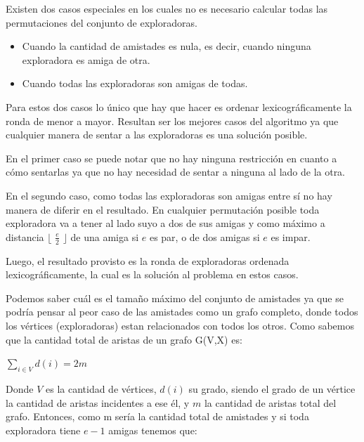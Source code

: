 \documentclass[11pt]{article}
\begin{document}
Existen dos casos especiales en los cuales no es necesario calcular todas las permutaciones del conjunto de exploradoras.
\begin{itemize}
  \item Cuando la cantidad de amistades es nula, es decir, cuando ninguna exploradora es amiga de otra.
  \item Cuando todas las exploradoras son amigas de todas.
\end{itemize}
Para estos dos casos lo único que hay que hacer es ordenar lexicográficamente la ronda de menor a mayor. 
Resultan ser los mejores casos del algoritmo ya que cualquier manera de sentar a las exploradoras 
es una solución posible.

En el primer caso se puede notar que no hay ninguna restricción en cuanto a cómo sentarlas 
ya que no hay necesidad de sentar a ninguna al lado de la otra.

En el segundo caso, como todas las exploradoras 
son amigas entre sí no hay manera de diferir en el resultado. En cualquier permutación posible toda exploradora va a tener al lado suyo 
a dos de sus amigas y como máximo a distancia $\lfloor$ $\frac{e}{2}$ $\rfloor$ de una amiga si $e$ es par, o de 
dos amigas si $e$ es impar. 

Luego, el resultado provisto es la ronda de exploradoras ordenada lexicográficamente, la cual es la solución 
al problema en estos casos.

Podemos saber cuál es el tamaño máximo del conjunto de amistades ya que 
se podría pensar al peor caso de las amistades como un grafo completo, donde todos los vértices (exploradoras) estan
relacionados con todos los otros. Como sabemos que la cantidad total de aristas de un grafo G(V,X) es:

\vspace{3mm}

\begin{center}
$\sum\nolimits_{i \in V}d(i) = 2m$ 
\end{center}

\vspace{3mm}

Donde $V$ es la cantidad de vértices, $d(i)$ su grado, siendo el grado de un vértice la 
cantidad de aristas incidentes a ese él, y $m$ la cantidad de aristas total del grafo. Entonces, como
m sería la cantidad total de amistades y si toda exploradora tiene $e-1$ amigas tenemos que:

\vspace{3mm}
\end{document}

